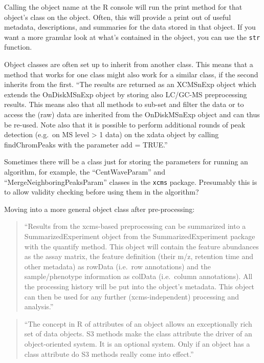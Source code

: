 \documentclass[]{tufte-book}
\begin{document}
Calling the object name at the R console will run the print method for
that object's class on the object. Often, this will provide a print out of
useful metadata, descriptions, and summaries for the data stored in that
object. If you want a more granular look at what's contained in the
object, you can use the \texttt{str} function.

Object classes are often set up to inherit from another class. This means
that a method that works for one class might also work for a similar
class, if the second inherits from the first.
``The results are returned as an XCMSnExp object which extends the OnDiskMSnExp object by storing also LC/GC-MS preprocessing results. This means also that all methods to sub-set and filter the data or to access the (raw) data are inherited from the OnDiskMSnExp object and can thus be re-used. Note also that it is possible to perform additional rounds of peak detection (e.g.~on MS level \textgreater{} 1 data) on the xdata object by calling findChromPeaks with the parameter add = TRUE.'' \citep{smith2013lc}

Sometimes there will be a class just for storing the parameters for
running an algorithm, for example, the ``CentWaveParam'' and
``MergeNeighboringPeaksParam'' classes in the \texttt{xcms} package.
Presumably this is to allow validity checking before using them
in the algorithm?

Moving into a more general object class after pre-processing:

\begin{quote}
``Results from the xcms-based preprocessing can be summarized into a SummarizedExperiment object from the SummarizedExperiment package with the quantify method. This object will contain the feature abundances as the assay matrix, the feature definition (their m/z, retention time and other metadata) as rowData (i.e.~row annotations) and the sample/phenotype information as colData (i.e.~column annotations). All the processing history will be put into the object's metadata. This object can then be used for any further (xcms-independent) processing and analysis.'' \citep{smith2013lc}
\end{quote}

\begin{quote}
``The concept in R of attributes of an object allows an exceptionally rich
set of data objects. S3 methods make the class attribute the driver of an
object-oriented system. It is an optional system. Only if an object has a class
attribute do S3 methods really come into effect.'' \citep{burns2011r}
\end{quote}
\end{document}

